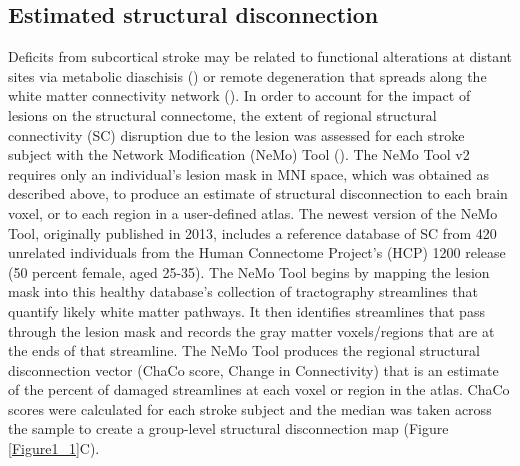 \documentclass[phd,tocprelim]{cornell}
\begin{document}
	\subsection{Estimated structural disconnection}
	Deficits from subcortical stroke may be related to functional alterations at distant sites via metabolic diaschisis (\cite{Hillis2002-dz, Corbetta2015-ez}) or remote degeneration that spreads along the white matter connectivity network (\cite{Duering2015-iv, Cheng2015-jq}). In order to account for the impact of lesions on the structural connectome, the extent of regional structural connectivity (SC) disruption due to the lesion was assessed for each stroke subject with the Network Modification (NeMo) Tool (\cite{Kuceyeski2013-nk}). The NeMo Tool v2 requires only an individual’s lesion mask in MNI space, which was obtained as described above, to produce an estimate of structural disconnection to each brain voxel, or to each region in a user-defined atlas. The newest version of the NeMo Tool, originally published in 2013, includes a reference database of SC from 420 unrelated individuals from the Human Connectome Project’s (HCP) 1200 release (50 percent female, aged 25-35). The NeMo Tool begins by mapping the lesion mask into this healthy database’s collection of tractography streamlines that quantify likely white matter pathways. It then identifies streamlines that pass through the lesion mask and records the gray matter voxels/regions that are at the ends of that streamline. The NeMo Tool produces the regional structural disconnection vector (ChaCo score, Change in Connectivity) that is an estimate of the percent of damaged streamlines at each voxel or region in the atlas. ChaCo scores were calculated for each stroke subject and the median was taken across the sample to create a group-level structural disconnection map (Figure \ref{Figure1_1}C).
\end{document}
